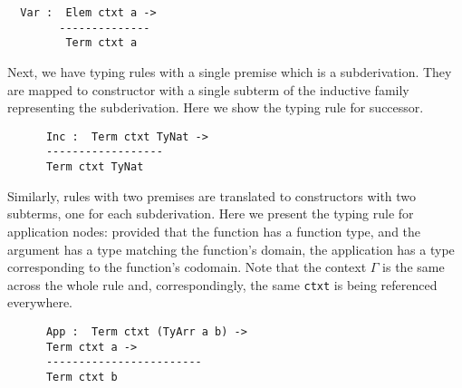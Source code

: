 \begin{center}
\begin{minipage}{0.45\textwidth}
\inferenceVar
\end{minipage}\hfill
\begin{minipage}{0.45\textwidth}
\begin{Verbatim}
  Var :  Elem ctxt a ->
        --------------
         Term ctxt a
\end{Verbatim}
\end{minipage}
\end{center}

Next, we have typing rules with a single premise which is a subderivation.
They are mapped to constructor with a single subterm of the inductive family
representing the subderivation.
%
Here we show the typing rule for successor.

\begin{center}
  \begin{minipage}{0.45\textwidth}
    \inferenceInc
  \end{minipage}\hfill
  \begin{minipage}{0.45\textwidth}
    \begin{Verbatim}
      Inc :  Term ctxt TyNat ->
      ------------------
      Term ctxt TyNat
    \end{Verbatim}
  \end{minipage}
\end{center}

Similarly, rules with two premises are translated to constructors
with two subterms, one for each subderivation.
%
Here we present the typing rule for application nodes: provided that
the function has a function type, and the argument has a type matching
the function's domain, the application has a type corresponding to the
function's codomain.
Note that the context $\Gamma$ is the same across the whole rule and,
correspondingly, the same \texttt{ctxt} is being referenced everywhere.

\begin{center}
  \begin{minipage}{0.35\textwidth}
    \inferenceApp
  \end{minipage}\hfill
  \begin{minipage}{0.55\textwidth}
    \begin{Verbatim}
      App :  Term ctxt (TyArr a b) ->
      Term ctxt a ->
      ------------------------
      Term ctxt b
    \end{Verbatim}
  \end{minipage}
\end{center}

